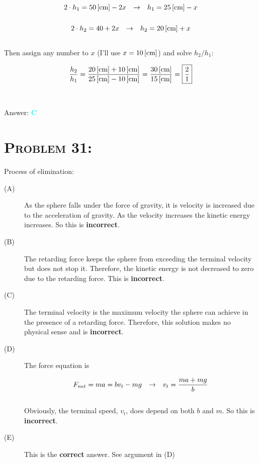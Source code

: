 \documentclass{article}
\begin{document}
\begin{gather}
2 \cdot h_{1} = \unit[50]{[cm]} -2x \hspace{.1in} \rightarrow \hspace{.1in}  h_{1} = \unit[25]{[cm]} -x\nonumber\\
\nonumber\\
2 \cdot h_{2} = 40 +2x \hspace{.1in} \rightarrow \hspace{.1in} h_{2}  = \unit[20]{[cm]} + x \nonumber
\end{gather}
\\
Then assign any number to $x$ (I'll use $x = \unit[10]{[cm]}$) and solve $h_{2}/h_{1}$:

\begin{gather}
\frac{h_{2}}{h_{1}} =  \frac{\unit[20]{[cm]} + \unit[10]{[cm]}}{\unit[25]{[cm]} - \unit[10]{[cm]}} = \frac{\unit[30]{[cm]}}{\unit[15]{[cm]}} = \boxed{\frac{2}{1}} \nonumber
\end{gather}
\\\\
Answer: \textbf{\textcolor{cyan}C}\\


\section{\textsc{Problem 31:}} Process of elimination:

\begin{description}

\item[(A)] As the sphere falls under the force of gravity, it is velocity is increased due to the acceleration of gravity. As the velocity increases the kinetic energy increases. So this is \textbf{incorrect}.

\item[(B)] The retarding force keeps the sphere from exceeding the terminal velocity but does not stop it. Therefore, the kinetic energy is not decreased to zero due to the retarding force. This is \textbf{incorrect}.

\item[(C)] The terminal velocity is the maximum velocity the sphere can achieve in the presence of a retarding force. Therefore, this solution makes no physical sense and is \textbf{incorrect}.

\item[(D)] The force equation is 

\begin{gather}
F_{net} = m a = b v_{t} - m g \hspace{.1in} \rightarrow \hspace{.1in} v_{t} = \frac{m a + m g}{b}\nonumber
\end{gather}
\\
Obviously, the terminal speed, $v_{t}$, does depend on both $b$ and $m$. So this is \textbf{incorrect}.

\item[(E)] This is the \textbf{correct} answer. See argument in (D)

\end{description}
\end{document}
